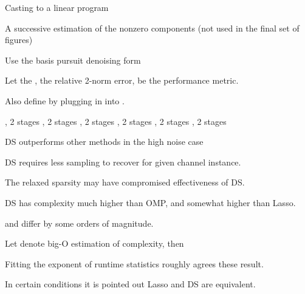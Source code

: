 {
\I Casting to a linear program

\I A successive estimation of the nonzero components (not used in the final set of figures)

\I Use the basis pursuit denoising form
}
{
\I Let the \m {\T {\chi}}, the relative 2-norm error, be the performance metric.


\I Also define \m {\chi} by plugging in  into \m {\T {\chi}}.
}
{
\I {}, 2 stages
\blank [big]
}
{
\I {}, 2 stages
\blank [big]
}
{
\I {}, 2 stages
\blank [big]
}
{
\I {}, 2 stages
\blank [big]
}
{
\I {}, 2 stages
\blank [big]
}
{
\I {}, 2 stages
\blank [big]
}
{
\I DS outperforms other methods in the high noise case

\I DS requires less sampling to recover for given channel instance.

\I The relaxed sparsity may have compromised effectiveness of DS.

\I DS has complexity much higher than OMP, and somewhat higher than Lasso.

\I \m {\T {\chi}} and \m {\chi} differ by some orders of magnitude.
}
{
\I Let  denote big-O estimation of complexity, then

\I Fitting the exponent of runtime statistics roughly agrees these result.

\I In certain conditions it is pointed out Lasso and DS are equivalent.
}



